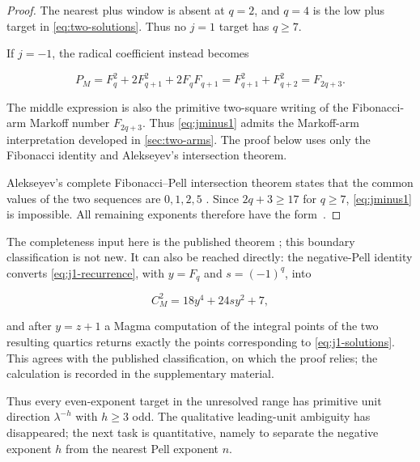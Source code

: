 \begin{proof}
The nearest plus window is absent at $q=2$, and $q=4$ is the low plus target
in \cref{eq:two-solutions}. Thus no $j=1$ target has $q\geqslant7$.

If $j=-1$, the radical coefficient instead becomes

\begin{equation}
 P_M=F_q^2+2F_{q+1}^2+2F_qF_{q+1}
 =F_{q+1}^2+F_{q+2}^2
 =F_{2q+3}.
 \label{eq:jminus1}
\end{equation}

The middle expression is also the primitive two-square writing of the
Fibonacci-arm Markoff number $F_{2q+3}$. Thus \cref{eq:jminus1} admits the
Markoff-arm interpretation developed in \cref{sec:two-arms}. The proof below
uses only the Fibonacci identity and Alekseyev's intersection theorem.

Alekseyev's complete Fibonacci--Pell intersection theorem states that the
common values of the two sequences are $0,1,2,5$ \cite[Theorem~9]{Alekseyev2011}.
Since $2q+3\geqslant17$ for $q\geqslant7$, \cref{eq:jminus1} is
impossible. All remaining exponents therefore have the form~.
\end{proof}

\begin{remark}
\label{rem:quartic-status}
The completeness input here is the published theorem
\cite{AlekseyevTengely2014}; this boundary classification is not new. It can
also be reached directly: the negative-Pell identity converts
\cref{eq:j1-recurrence}, with $y=F_q$ and $s=(-1)^q$, into

\begin{equation}
 C_M^2=18y^4+24sy^2+7,
\end{equation}

and after $y=z+1$ a Magma computation of the integral points of the two
resulting quartics returns exactly the points corresponding to
\cref{eq:j1-solutions}. This agrees with the published classification, on
which the proof relies; the calculation is recorded in the supplementary material.
\end{remark}

Thus every even-exponent target in the unresolved range has primitive unit
direction $\lambda^{-h}$ with $h\geqslant3$ odd. The qualitative
leading-unit ambiguity has disappeared; the next task is quantitative,
namely to separate the negative exponent $h$ from the nearest Pell exponent
$n$.
